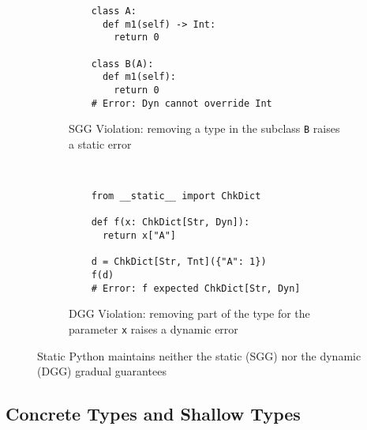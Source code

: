 \documentclass[english,cleveref,submission]{programming}
\newcommand{\SP}{Static Python}
\newcommand{\code}[1]{\texttt{#1}}
\begin{document}
\begin{figure}
  \begin{subfigure}[t]{0.5\columnwidth}
  \begin{spcodebox}
  \begin{verbatim}
    class A:
      def m1(self) -> Int:
        return 0

    class B(A):
      def m1(self):
        return 0
    # Error: Dyn cannot override Int
  \end{verbatim}
  \end{spcodebox}
    \caption{SGG Violation: removing a type in the subclass \code{B} raises a static error}
    \label{f:gg-failure-stat}
  \end{subfigure}
  ~
  \begin{subfigure}[t]{0.5\columnwidth}
  \begin{spcodebox}
  \begin{verbatim}
    from __static__ import ChkDict

    def f(x: ChkDict[Str, Dyn]):
      return x["A"]

    d = ChkDict[Str, Tnt]({"A": 1})
    f(d)
    # Error: f expected ChkDict[Str, Dyn]
  \end{verbatim}
  \end{spcodebox}
    \caption{DGG Violation: removing part of the type for the parameter \code{x} raises a dynamic error}
    \label{f:gg-failure-dyn}
  \end{subfigure}
  \caption{\SP{} maintains neither the static (SGG) nor the dynamic (DGG) gradual guarantees}
  \label{fig:gg-failure}
\end{figure}



\subsection{Concrete Types and Shallow Types}
\label{s:checked-type}
\end{document}
